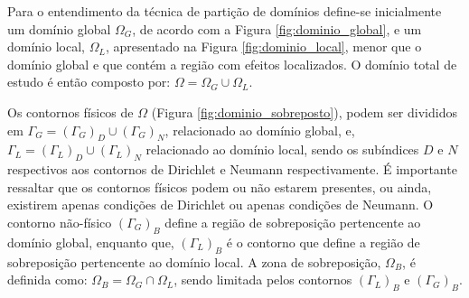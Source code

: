 Para o entendimento da técnica de partição de domínios define-se inicialmente um domínio global $\Omega_G$, de acordo com a Figura  \ref{fig:dominio_global}, e um domínio local, $\Omega_L$, apresentado na Figura \ref{fig:dominio_local}, menor que o domínio global e que contém a região com efeitos localizados. O domínio total de estudo é então composto por: $\Omega = \Omega_G \cup \Omega_L$.

Os contornos físicos de $\Omega$  (Figura \ref{fig:dominio_sobreposto}), podem ser divididos em $\Gamma_{G} = (\Gamma_{G})_D \cup (\Gamma_{G})_N$, relacionado ao domínio global, e, $\Gamma_{L} = (\Gamma_{L})_D \cup (\Gamma_{L})_N$ relacionado ao domínio local, sendo os subíndices $D$ e $N$ respectivos aos contornos de Dirichlet e Neumann respectivamente. É importante ressaltar que os contornos físicos podem ou não estarem presentes, ou ainda, existirem apenas condições de Dirichlet ou apenas condições de Neumann. O contorno não-físico $(\Gamma_{G})_{B}$ define a região de sobreposição pertencente ao domínio global, enquanto que, $(\Gamma_{L})_{B}$ é o contorno que define a região de sobreposição pertencente ao domínio local. A zona de sobreposição, $\Omega_{B}$, é definida como: $ \Omega_{B} = \Omega_G \cap \Omega_L$, sendo limitada pelos contornos $(\Gamma_{L})_{B}$ e $(\Gamma_{G})_{B}$.

